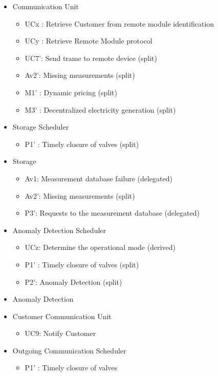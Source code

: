 \begin{itemize}
	\item Communication Unit
	\begin{itemize}
	  	\item UCx : Retrieve Customer from remote module identification %
	  	\item UCy : Retrieve Remote Module protocol
		\item UC7': Send trame to remote device (split)
		\item Av2': Missing measurements (split)
		\item M1' : Dynamic pricing (split)
		\item M3' : Decentralized electricity generation (split)
	\end{itemize}
	\item Storage Scheduler
	\begin{itemize}
		\item P1' : Timely closure of valves (split)
	\end{itemize}
	\item Storage
	\begin{itemize}
		\item Av1: Measurement database failure (delegated)
		\item Av2': Missing measurements (split)
	  	\item P3': Requests to the measurement database (delegated)
	\end{itemize}
	\item Anomaly Detection Scheduler
	\begin{itemize}
		\item UCz: Determine the operational mode (derived)
		\item P1' : Timely closure of valves (split)
	  	\item P2': Anomaly Detection (split)
	\end{itemize}
	\item Anomaly Detection
	\item Customer Communication Unit
	\begin{itemize}
		\item UC9: Notify Customer
	\end{itemize}
	\item Outgoing Communication Scheduler
	\begin{itemize}
	  \item P1' : Timely closure of valves

\end{itemize}
\end{itemize}
